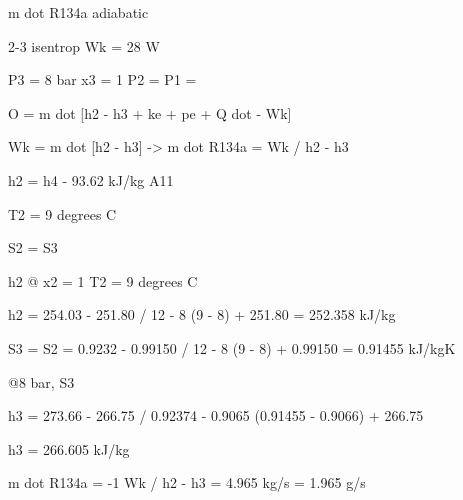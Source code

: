 m dot R134a adiabatic

2-3 isentrop Wk = 28 W

P3 = 8 bar x3 = 1 P2 = P1 =

O = m dot [h2 - h3 + ke + pe + Q dot - Wk]

Wk = m dot [h2 - h3] -> m dot R134a = Wk / h2 - h3

h2 = h4 - 93.62 kJ/kg A11

T2 = 9 degrees C

S2 = S3

h2 @ x2 = 1 T2 = 9 degrees C

h2 = 254.03 - 251.80 / 12 - 8 (9 - 8) + 251.80 = 252.358 kJ/kg

S3 = S2 = 0.9232 - 0.99150 / 12 - 8 (9 - 8) + 0.99150 = 0.91455 kJ/kgK

@8 bar, S3

h3 = 273.66 - 266.75 / 0.92374 - 0.9065 (0.91455 - 0.9066) + 266.75

h3 = 266.605 kJ/kg

m dot R134a = -1 Wk / h2 - h3 = 4.965 kg/s = 1.965 g/s